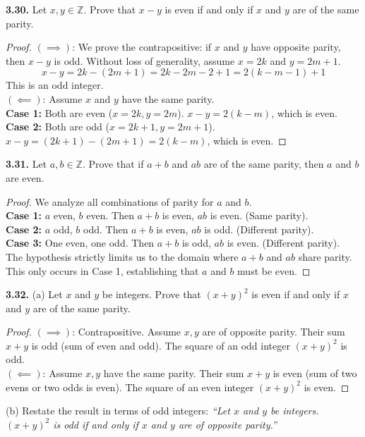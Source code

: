 \documentclass[11pt]{article}
\begin{document}
\textbf{3.30.} Let $x, y \in \mathbb{Z}$. Prove that $x - y$ is even if and only if $x$ and $y$ are of the same parity.
\begin{proof}
$(\implies)$: We prove the contrapositive: if $x$ and $y$ have opposite parity, then $x - y$ is odd. Without loss of generality, assume $x = 2k$ and $y = 2m + 1$. 
\[ x - y = 2k - (2m + 1) = 2k - 2m - 2 + 1 = 2(k - m - 1) + 1 \]
This is an odd integer. \\
$(\impliedby)$: Assume $x$ and $y$ have the same parity. \\
\textbf{Case 1:} Both are even ($x = 2k, y = 2m$). $x - y = 2(k - m)$, which is even. \\
\textbf{Case 2:} Both are odd ($x = 2k + 1, y = 2m + 1$). $x - y = (2k + 1) - (2m + 1) = 2(k - m)$, which is even.
\end{proof}

\textbf{3.31.} Let $a, b \in \mathbb{Z}$. Prove that if $a + b$ and $ab$ are of the same parity, then $a$ and $b$ are even.
\begin{proof}
We analyze all combinations of parity for $a$ and $b$. \\
\textbf{Case 1:} $a$ even, $b$ even. Then $a+b$ is even, $ab$ is even. (Same parity). \\
\textbf{Case 2:} $a$ odd, $b$ odd. Then $a+b$ is even, $ab$ is odd. (Different parity). \\
\textbf{Case 3:} One even, one odd. Then $a+b$ is odd, $ab$ is even. (Different parity). \\
The hypothesis strictly limits us to the domain where $a+b$ and $ab$ share parity. This only occurs in Case 1, establishing that $a$ and $b$ must be even.
\end{proof}

\textbf{3.32.} (a) Let $x$ and $y$ be integers. Prove that $(x + y)^2$ is even if and only if $x$ and $y$ are of the same parity.
\begin{proof}
$(\implies)$: Contrapositive. Assume $x,y$ are of opposite parity. Their sum $x+y$ is odd (sum of even and odd). The square of an odd integer $(x+y)^2$ is odd. \\
$(\impliedby)$: Assume $x,y$ have the same parity. Their sum $x+y$ is even (sum of two evens or two odds is even). The square of an even integer $(x+y)^2$ is even.
\end{proof}
\noindent (b) Restate the result in terms of odd integers: \textit{``Let $x$ and $y$ be integers. $(x + y)^2$ is odd if and only if $x$ and $y$ are of opposite parity.''}
\end{document}
